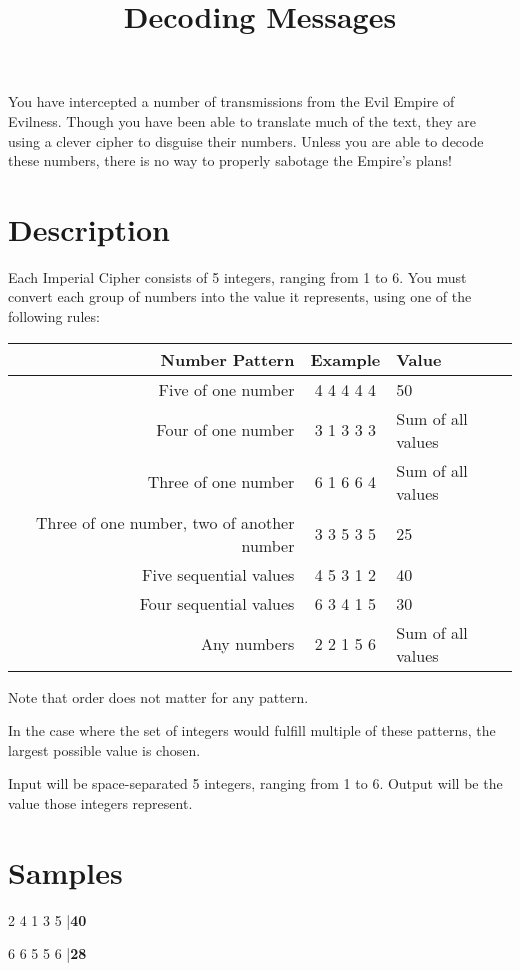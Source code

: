 \documentclass{../codeproblem}
\begin{document}
\title{Decoding Messages}

\begin{flavor}
  You have intercepted a number of transmissions from the Evil Empire of Evilness. Though you have been able to translate much of the text, they are using a clever cipher to disguise their numbers. Unless you are able to decode these numbers, there is no way to properly sabotage the Empire's plans!
\end{flavor}

\section*{Description}
Each Imperial Cipher consists of 5 integers, ranging from 1 to 6. You must convert each group of numbers into the value it represents, using one of the following rules:

\begin{center}
\begin{tabular}{| r | c | l |}\hline
  Number Pattern & Example & Value\\\hline
  Five of one number & 4 4 4 4 4 & 50\\\hline
  Four of one number & 3 1 3 3 3 & Sum of all values\\\hline
  Three of one number & 6 1 6 6 4 & Sum of all values\\\hline
  Three of one number, two of another number & 3 3 5 3 5 & 25\\\hline
  Five sequential values & 4 5 3 1 2 & 40\\\hline
  Four sequential values & 6 3 4 1 5 & 30\\\hline
  Any numbers & 2 2 1 5 6 & Sum of all values\\\hline
\end{tabular}
\end{center}

Note that order does not matter for any pattern.

In the case where the set of integers would fulfill multiple of these patterns, the largest possible value is chosen.

Input will be space-separated 5 integers, ranging from 1 to 6. Output will be the value those integers represent.

\section*{Samples}
\begin{example}
2 4 1 3 5
|\textbf{40}\end{example}

\begin{example}
6 6 5 5 6
|\textbf{28}\end{example}
\end{document}
